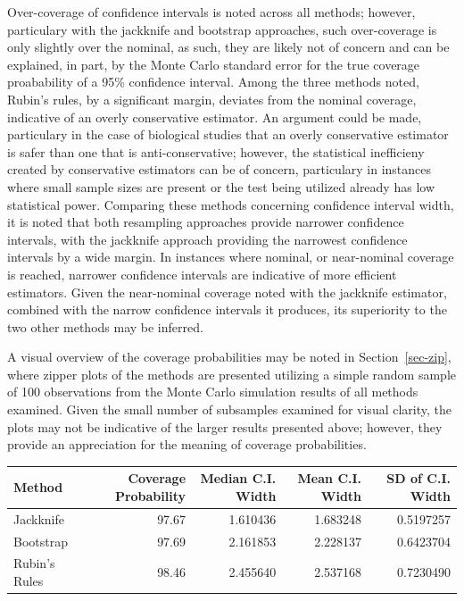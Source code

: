 \documentclass[
  letterpaper,
  DIV=11,
  numbers=noendperiod]{scrreprt}
\begin{document}
Over-coverage of confidence intervals is noted across all methods;
however, particulary with the jackknife and bootstrap approaches, such
over-coverage is only slightly over the nominal, as such, they are
likely not of concern and can be explained, in part, by the Monte Carlo
standard error for the true coverage proabability of a 95\% confidence
interval. Among the three methods noted, Rubin's rules, by a significant
margin, deviates from the nominal coverage, indicative of an overly
conservative estimator. An argument could be made, particulary in the
case of biological studies that an overly conservative estimator is
safer than one that is anti-conservative; however, the statistical
inefficieny created by conservative estimators can be of concern,
particulary in instances where small sample sizes are present or the
test being utilized already has low statistical power. Comparing these
methods concerning confidence interval width, it is noted that both
resampling approaches provide narrower confidence intervals, with the
jackknife approach providing the narrowest confidence intervals by a
wide margin. In instances where nominal, or near-nominal coverage is
reached, narrower confidence intervals are indicative of more efficient
estimators. Given the near-nominal coverage noted with the jackknife
estimator, combined with the narrow confidence intervals it produces,
its superiority to the two other methods may be inferred.

A visual overview of the coverage probabilities may be noted in
Section~\ref{sec-zip}, where zipper plots of the methods are presented
utilizing a simple random sample of 100 observations from the Monte
Carlo simulation results of all methods examined. Given the small number
of subsamples examined for visual clarity, the plots may not be
indicative of the larger results presented above; however, they provide
an appreciation for the meaning of coverage probabilities.

\begin{tabular}{l|r|r|r|r}
\hline
Method & Coverage Probability & Median C.I. Width & Mean C.I. Width & SD of C.I. Width\\
\hline
Jackknife & 97.67 & 1.610436 & 1.683248 & 0.5197257\\
\hline
Bootstrap & 97.69 & 2.161853 & 2.228137 & 0.6423704\\
\hline
Rubin's Rules & 98.46 & 2.455640 & 2.537168 & 0.7230490\\
\hline
\end{tabular}
\end{document}

